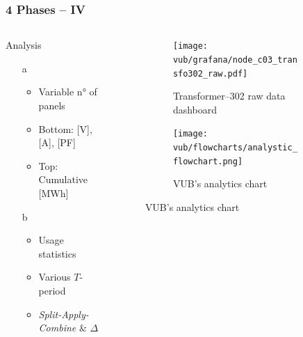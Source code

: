 \begin{frame}
    \frametitle{4 Phases -- IV}
    \vspace*{\fill}
    \begin{columns}[onlytextwidth, c]
        \begin{column}{.47\textwidth}
            \begin{exampleblock}{Analysis}
                \begin{itemize}
                    \item[a]
                        \begin{itemize} %
                            \item Variable n° of panels
                            \item Bottom: [V], [A], [PF]
                            \item Top: Cumulative [MWh]
                        \end{itemize}
                    \item[b]
                        \begin{itemize}
                            \item Usage statistics
                            \item Various $T$-period
                            \item \textit{Split-Apply-Combine} \& $\Delta$
                        \end{itemize}
                \end{itemize}
            \end{exampleblock}
        \end{column}
        \begin{column}{.52\textwidth}
            \begin{figure}[ht]
                \begin{subfigure}{\textwidth}
                    \centering
                    \texttt{[image: vub/grafana/node\_c03\_transfo302\_raw.pdf]}
                    \caption{Transformer--302 raw data dashboard}
                \end{subfigure}
                \begin{subfigure}{\textwidth}
                    \centering
                    \texttt{[image: vub/flowcharts/analystic\_flowchart.png]}
                    \caption{\acs{VUB}'s analytics chart}
                \end{subfigure}
            \end{figure}
        \end{column}
    \end{columns}
    \vspace*{\fill}
\end{frame}



